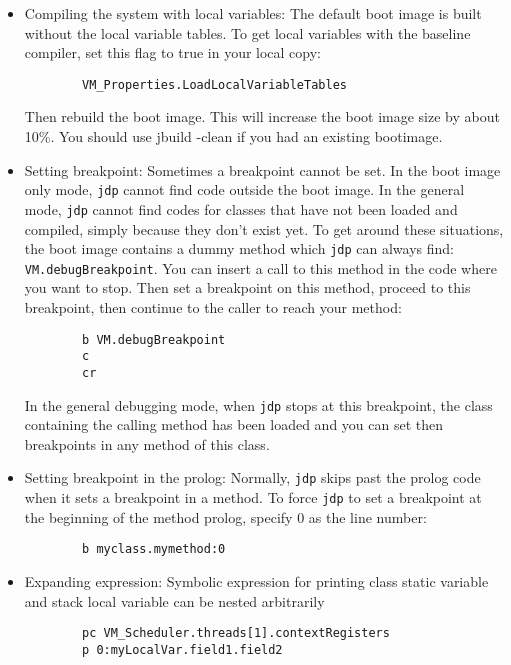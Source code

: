\begin{itemize}
\item Compiling the system with local variables:
  The default boot image is built without the local variable tables.
  To get local variables with the baseline compiler, set this flag to 
  true in your local copy:
\begin{verbatim}
        VM_Properties.LoadLocalVariableTables
\end{verbatim}
  Then rebuild the boot image. This will increase the boot image size 
  by about 10\%. You should use jbuild -clean if you had an existing bootimage.

\item Setting breakpoint:
  Sometimes a breakpoint cannot be set.  In the boot image only mode, {\tt jdp}
  cannot find code outside the boot image.  In the general mode, {\tt jdp} cannot
  find codes for classes that have not been loaded and compiled, simply
  because they don't exist yet.  To get around these
  situations, the boot image contains a dummy method which {\tt jdp} can always
  find:
        {\tt VM.debugBreakpoint}.  
  You can insert a call to this method in the code where you want to stop.
  Then set a breakpoint on this method, proceed to this breakpoint, then
  continue to the caller to reach your method:
\begin{verbatim}
        b VM.debugBreakpoint
        c
        cr
\end{verbatim}
  In the general debugging mode, when {\tt jdp} stops at this breakpoint, the 
  class containing the calling method has been loaded and you can set then
  breakpoints in any method of this class.


\item Setting breakpoint in the prolog:
  Normally, {\tt jdp} skips past the prolog code when it sets a breakpoint in
  a method.  To force {\tt jdp} to set a breakpoint at the beginning of the
  method prolog, specify 0 as the line number:
\begin{verbatim}
        b myclass.mymethod:0
\end{verbatim}


\item Expanding expression:
  Symbolic expression for printing class static variable and stack local
  variable can be nested arbitrarily
\begin{verbatim}
        pc VM_Scheduler.threads[1].contextRegisters
        p 0:myLocalVar.field1.field2
\end{verbatim}



\end{itemize}
